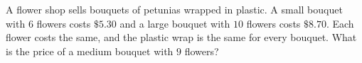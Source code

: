A flower shop sells bouquets of petunias wrapped in plastic. A small bouquet with $6$ flowers costs $\$5.30$ and a large bouquet with $10$ flowers costs $\$8.70$. Each flower costs the same, and the plastic wrap is the same for every bouquet. What is the price of a medium bouquet with $9$ flowers?
